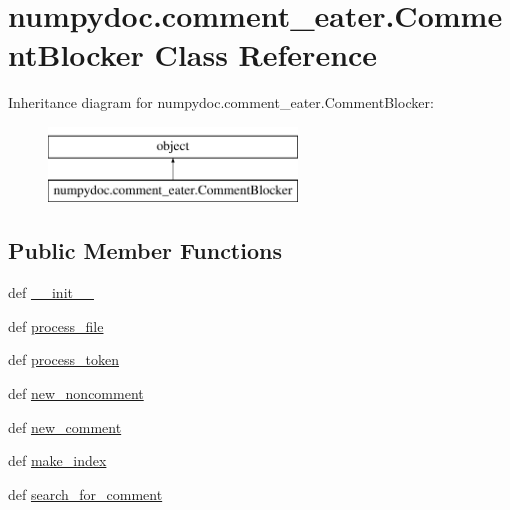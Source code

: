 \hypertarget{classnumpydoc_1_1comment__eater_1_1CommentBlocker}{}\section{numpydoc.\+comment\+\_\+eater.\+Comment\+Blocker Class Reference}
\label{classnumpydoc_1_1comment__eater_1_1CommentBlocker}
Inheritance diagram for numpydoc.\+comment\+\_\+eater.\+Comment\+Blocker\+:\begin{figure}[H]
\begin{center}
\leavevmode
\includegraphics[height=2.000000cm]{classnumpydoc_1_1comment__eater_1_1CommentBlocker}
\end{center}
\end{figure}
\subsection*{Public Member Functions}
\begin{DoxyCompactItemize}
\item 
def \hyperlink{classnumpydoc_1_1comment__eater_1_1CommentBlocker_a353f2f85b71a6755ac90b511778e197f}{\+\_\+\+\_\+init\+\_\+\+\_\+}
\item 
def \hyperlink{classnumpydoc_1_1comment__eater_1_1CommentBlocker_a88b350807803f7010cf13cdc7436bb68}{process\+\_\+file}
\item 
def \hyperlink{classnumpydoc_1_1comment__eater_1_1CommentBlocker_ab7ecfa4928606ec487220be2a2acb6dd}{process\+\_\+token}
\item 
def \hyperlink{classnumpydoc_1_1comment__eater_1_1CommentBlocker_aeeafc4fb271ad0554fcbf02ddd15874c}{new\+\_\+noncomment}
\item 
def \hyperlink{classnumpydoc_1_1comment__eater_1_1CommentBlocker_aa61038b7d215b430a3e7102dae274e39}{new\+\_\+comment}
\item 
def \hyperlink{classnumpydoc_1_1comment__eater_1_1CommentBlocker_afc5608a4a65d737a6e2ff648286c494f}{make\+\_\+index}
\item 
def \hyperlink{classnumpydoc_1_1comment__eater_1_1CommentBlocker_a396b7d9516a387d73b5445af322ffece}{search\+\_\+for\+\_\+comment}
\end{DoxyCompactItemize}
